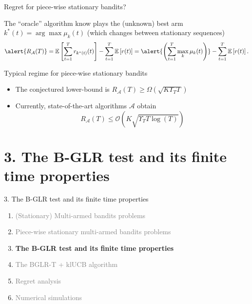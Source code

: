 \documentclass[11pt,english,ignorenonframetext,]{beamer}
\begin{document}
\begin{frame}{Regret for piece-wise stationary bandits?}

  The ``oracle'' algorithm know plays the (unknown) best arm $k^*(t) = \arg\max \mu_k(t)$
  (which changes between stationary sequences)
  \[ \alert{ R_{\mathcal{A}}(T) } = \mathbb{E}\left[ \sum\limits_{t=1}^T r_{k^*(t)}(t) \right] - \sum\limits_{t=1}^T \mathbb{E}\left[ r(t) \right] = \alert{\left(\sum_{t=1}^T \max_k \mu_k(t) \right)} - \sum\limits_{t=1}^T \mathbb{E}\left[ r(t) \right]. \]

\pause
\vspace*{10pt}

\begin{exampleblock}{Typical regime for piece-wise stationary bandits}
  \begin{itemize}
  \item
  The conjectured lower-bound is
  $R_{\mathcal{A}}(T) \geq \Omega(\sqrt{K \Upsilon_T T})$

  \item
  Currently, state-of-the-art algorithms $\mathcal{A}$ obtain
  \[ R_{\mathcal{A}}(T) \leq \mathcal{O}(K \sqrt{\Upsilon_T T \log(T)}) \]
  \end{itemize}
\end{exampleblock}

\end{frame}


\section{\hfill{}3. The B-GLR test and its finite time properties\hfill{}}

\begin{frame}{3. The B-GLR test and its finite time properties}

  \begin{enumerate}
    \item
    \textcolor{gray}{
      (Stationary) Multi-armed bandits problems
    }
    \vspace*{15pt}

    \item
    \textcolor{gray}{
      Piece-wise stationary multi-armed bandits problems
    }
    \vspace*{15pt}

    \item
    \alert{\textbf{%
      The B-GLR test and its finite time properties
    }}
    \vspace*{15pt}

    \item
    \textcolor{gray}{
      The BGLR-T + klUCB algorithm
    }
    \vspace*{15pt}

    \item
    \textcolor{gray}{
      Regret analysis
    }
    \vspace*{15pt}

    \item
    \textcolor{gray}{
      Numerical simulations
    }
  \end{enumerate}

\end{frame}
\end{document}
